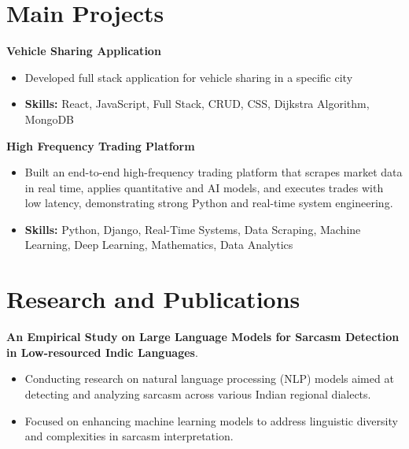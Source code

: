 \documentclass[a4paper,11pt]{article}
\begin{document}
\section{\textbf{Main Projects}}

\vspace{1mm}
  \textbf{Vehicle Sharing Application  }
\vspace{-1.5mm} %
\begin{itemize}
  \item Developed full stack application for vehicle sharing in a specific city
\vspace{-3mm}
  \item \textbf{Skills:} React, JavaScript, Full Stack, CRUD, CSS, Dijkstra Algorithm, MongoDB
\end{itemize}


\vspace{1mm}
   \textbf{High Frequency Trading Platform }
\vspace{-1.5mm} %
\begin{itemize}
  \item Built an end-to-end high-frequency trading platform that scrapes market data in real time, applies quantitative and AI models, and executes trades with low latency, demonstrating strong Python and real-time system engineering.
\vspace{-3mm}
  \item \textbf{Skills:} Python, Django, Real-Time Systems, Data Scraping, Machine Learning, Deep Learning, Mathematics, Data Analytics
\end{itemize}



\section{\textbf{Research and Publications} \hfill }
\vspace{1mm}
  \textbf{An Empirical Study on Large Language Models for Sarcasm Detection in Low-resourced Indic Languages}.
\vspace{-1mm} %
\begin{itemize}
  \item Conducting research on natural language processing (NLP) models aimed at detecting and analyzing sarcasm across various Indian regional dialects.
\vspace{-3mm}
  \item Focused on enhancing machine learning models to address linguistic diversity and complexities in sarcasm interpretation.
\end{itemize}
\end{document}
